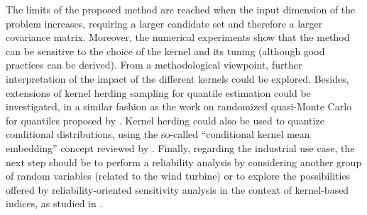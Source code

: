 The limits of the proposed method are reached when the input dimension of the problem increases, requiring a larger candidate set and therefore a larger covariance matrix. 
Moreover, the numerical experiments show that the method can be sensitive to the choice of the kernel and its tuning (although good practices can be derived). 
From a methodological viewpoint, further interpretation of the impact of the different kernels could be explored. 
Besides, extensions of kernel herding sampling for quantile estimation could be investigated, in a similar fashion as the work on randomized quasi-Monte Carlo for quantiles proposed by \cite{tuffin_2019}. 
Kernel herding could also be used to quantize conditional distributions, using the so-called ``conditional kernel mean embedding'' concept reviewed by \cite{sullivan_2020}. 
Finally, regarding the industrial use case, the next step should be to perform a reliability analysis by considering another group of random variables (related to the wind turbine) or to explore the possibilities offered by reliability-oriented sensitivity analysis in the context of kernel-based indices, as studied in \citet{marrel_chabridon_2021}.

